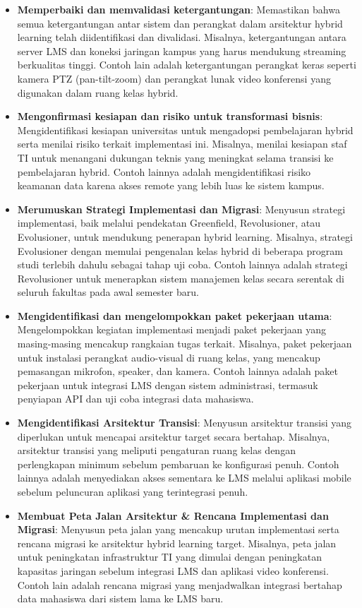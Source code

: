\begin{itemize}
	\item \textbf{Memperbaiki dan memvalidasi ketergantungan}: Memastikan bahwa semua ketergantungan antar sistem dan perangkat dalam arsitektur hybrid learning telah diidentifikasi dan divalidasi. Misalnya, ketergantungan antara server LMS dan koneksi jaringan kampus yang harus mendukung streaming berkualitas tinggi. Contoh lain adalah ketergantungan perangkat keras seperti kamera PTZ (pan-tilt-zoom) dan perangkat lunak video konferensi yang digunakan dalam ruang kelas hybrid.
	
	\item \textbf{Mengonfirmasi kesiapan dan risiko untuk transformasi bisnis}: Mengidentifikasi kesiapan universitas untuk mengadopsi pembelajaran hybrid serta menilai risiko terkait implementasi ini. Misalnya, menilai kesiapan staf TI untuk menangani dukungan teknis yang meningkat selama transisi ke pembelajaran hybrid. Contoh lainnya adalah mengidentifikasi risiko keamanan data karena akses remote yang lebih luas ke sistem kampus.
	
	\item \textbf{Merumuskan Strategi Implementasi dan Migrasi}: Menyusun strategi implementasi, baik melalui pendekatan Greenfield, Revolusioner, atau Evolusioner, untuk mendukung penerapan hybrid learning. Misalnya, strategi Evolusioner dengan memulai pengenalan kelas hybrid di beberapa program studi terlebih dahulu sebagai tahap uji coba. Contoh lainnya adalah strategi Revolusioner untuk menerapkan sistem manajemen kelas secara serentak di seluruh fakultas pada awal semester baru.
	
	\item \textbf{Mengidentifikasi dan mengelompokkan paket pekerjaan utama}: Mengelompokkan kegiatan implementasi menjadi paket pekerjaan yang masing-masing mencakup rangkaian tugas terkait. Misalnya, paket pekerjaan untuk instalasi perangkat audio-visual di ruang kelas, yang mencakup pemasangan mikrofon, speaker, dan kamera. Contoh lainnya adalah paket pekerjaan untuk integrasi LMS dengan sistem administrasi, termasuk penyiapan API dan uji coba integrasi data mahasiswa.
	
	\item \textbf{Mengidentifikasi Arsitektur Transisi}: Menyusun arsitektur transisi yang diperlukan untuk mencapai arsitektur target secara bertahap. Misalnya, arsitektur transisi yang meliputi pengaturan ruang kelas dengan perlengkapan minimum sebelum pembaruan ke konfigurasi penuh. Contoh lainnya adalah menyediakan akses sementara ke LMS melalui aplikasi mobile sebelum peluncuran aplikasi yang terintegrasi penuh.
	
	\item \textbf{Membuat Peta Jalan Arsitektur \& Rencana Implementasi dan Migrasi}: Menyusun peta jalan yang mencakup urutan implementasi serta rencana migrasi ke arsitektur hybrid learning target. Misalnya, peta jalan untuk peningkatan infrastruktur TI yang dimulai dengan peningkatan kapasitas jaringan sebelum integrasi LMS dan aplikasi video konferensi. Contoh lain adalah rencana migrasi yang menjadwalkan integrasi bertahap data mahasiswa dari sistem lama ke LMS baru.
\end{itemize}


